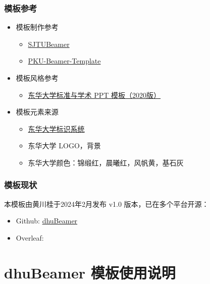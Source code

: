 \documentclass[12pt]{beamer}
\begin{document}
\begin{frame}
    \frametitle{模板参考}

    \begin{itemize}
        \item 模板制作参考
        \begin{itemize}
            \item \href{https://github.com/sjtug/SJTUBeamer}{SJTUBeamer}
            \item \href{https://www.overleaf.com/latex/templates/bei-da-zhong-wen-mo-ban-pku-beamer-template/kfxpbtzrqhrn}{PKU-Beamer-Template}
        \end{itemize}
        \item 模板风格参考
        \begin{itemize}
            \item \href{https://www.dhu.edu.cn/_upload/article/files/d2/8c/2137ec0c44238fd6fbd3ee28ff07/9f9b566a-67f1-4717-991f-477ee5b43acb.zip}{东华大学标准与学术 PPT 模板（2020版）}
        \end{itemize}
        \item 模板元素来源
        \begin{itemize}
            \item \href{https://www.dhu.edu.cn/bsxt/listm.htm}{东华大学标识系统}
            \item 东华大学 LOGO，背景
            \item 东华大学颜色：锦缎红，晨曦红，风帆黄，基石灰
        \end{itemize}
    \end{itemize}

\end{frame}

\begin{frame}
    \frametitle{模板现状}

    本模板由黄川桂于2024年2月发布 v1.0 版本，已在多个平台开源：

    \begin{itemize}
        \item Github: \href{https://github.com/3000ye/dhuBeamer}{dhuBeamer}
        \item Overleaf: 
    \end{itemize}

\end{frame}

\section{dhuBeamer 模板使用说明}


\makebottom
\end{document}

